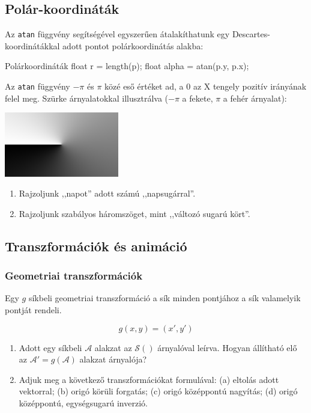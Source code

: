 \subsection{Polár-koordináták}

Az \texttt{atan} függvény segítségével egyszerűen átalakíthatunk egy Descartes-koordinátákkal adott
pontot polárkoordinátás alakba:

\begin{glsl}{Polárkoordináták}
float r = length(p);
float alpha = atan(p.y, p.x);
\end{glsl}

Az \texttt{atan} függvény $-\pi$ és $\pi$ közé eső értéket ad, a 0 az X tengely pozitív irányának felel meg.
Szürke árnyalatokkal illusztrálva ($-\pi$ a fekete, $\pi$ a fehér árnyalat):

\includegraphics[width=5cm]{images/atan.png}

\progfeladatok

\begin{enumerate}[resume]
  \item Rajzoljunk ,,napot'' adott számú ,,napsugárral''.
  \item Rajzoljunk szabályos háromszöget, mint ,,változó sugarú kört''.
\end{enumerate}

\subsection{Transzformációk és animáció}

\subsubsection{Geometriai transzformációk}

Egy $g$ síkbeli geometriai transzformáció a sík minden pontjához a sík valamelyik pontját rendeli.

$$g(x, y) = (x', y')$$

\matfeladatok

\begin{enumerate}[resume]
  \item Adott egy síkbeli $\mathcal{A}$ alakzat az $\mathcal{S}()$ árnyalóval leírva. Hogyan állítható elő
  az $\mathcal{A}' = g(\mathcal{A})$ alakzat árnyalója?
  \item Adjuk meg a következő transzformációkat formulával:
  (a) eltolás adott vektorral;
  (b) origó körüli forgatás;
  (c) origó középpontú nagyítás;
  (d) origó középpontú, egységsugarú inverzió.
\end{enumerate}


